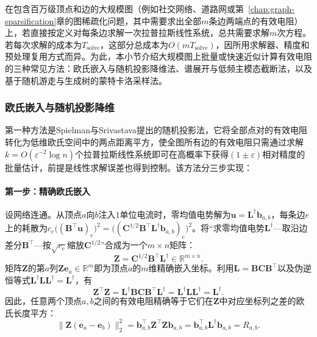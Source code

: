 在包含百万级顶点和边的大规模图（例如社交网络、道路网或第~\ref{chap:graph-sparsification}章的图稀疏化问题，其中需要求出全部$m$条边两端点的有效电阻）上，若直接按定义对每条边求解一次拉普拉斯线性系统，总共需要求解$m$次方程。若每次求解的成本为$T_{\mathrm{solve}}$，这部分总成本为$O(mT_{\mathrm{solve}})$，因所用求解器、精度和预处理复用方式而异。为此，本小节介绍大规模图上批量或快速近似计算有效电阻的三种常见方法：欧氏嵌入与随机投影降维法、谱展开与低频主模态截断法，以及基于随机游走与生成树的蒙特卡洛采样法。

\subsubsection{欧氏嵌入与随机投影降维}
\label{sec:electrical-resistance-embedding}
\label{sec:electrical-resistance-jl}
\label{sec:electrical-resistance-solver-error}

第一种方法是Spielman与Srivastava提出的随机投影法，它将全部点对的有效电阻转化为低维欧氏空间中的两点距离平方，使全图所有边的有效电阻只需通过求解$k=O(\varepsilon^{-2}\log n)$个拉普拉斯线性系统即可在高概率下获得$(1\pm\varepsilon)$相对精度的批量估计，前提是线性求解误差也得到控制。该方法分三步实现：

\paragraph{第一步：精确欧氏嵌入}
设网络连通。从顶点$a$向$b$注入$1$单位电流时，零均值电势解为$\bm u = \bm L^\dagger \bm b_{a,b}$，每条边$e$上的耗散为$c_e\bigl((\bm B^\top\bm u)_e\bigr)^2 = \bigl((\bm C^{1/2}\bm B^\top\bm L^\dagger\bm b_{a,b})_e\bigr)^2$。将“求零均值电势$\bm L^\dagger$—取沿边差分$\bm B^\top$—按$\sqrt{c_e}$缩放$\bm C^{1/2}$”合成为一个$m\times n$矩阵：
\begin{equation}
  \bm Z = \bm C^{1/2} \bm B^\top \bm L^\dagger \in \mathbb R^{m \times n}.
  \label{eq:electrical-resistance-embedding}
\end{equation}
矩阵$\bm Z$的第$a$列$\bm Z\bm e_a\in\mathbb R^m$即为顶点$a$的$m$维精确嵌入坐标。利用$\bm L=\bm B\bm C\bm B^\top$以及伪逆恒等式$\bm L^\dagger\bm L\bm L^\dagger=\bm L^\dagger$，有
\[
  \bm Z^\top \bm Z
  = \bm L^\dagger \bm B\bm C \bm B^\top \bm L^\dagger
  = \bm L^\dagger \bm L \bm L^\dagger
  = \bm L^\dagger.
\]
因此，任意两个顶点$a,b$之间的有效电阻精确等于它们在$\bm Z$中对应坐标列之差的欧氏长度平方：
\[
  \lVert \bm Z(\bm e_a-\bm e_b) \rVert_2^2
  = \bm b_{a,b}^\top \bm Z^\top \bm Z\bm b_{a,b}
  = \bm b_{a,b}^\top \bm L^\dagger \bm b_{a,b}
  = R_{a,b}.
\]

